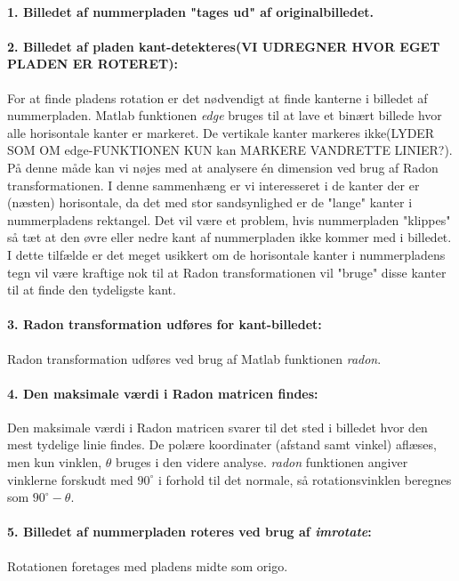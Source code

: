 \paragraph{1. Billedet af nummerpladen "tages ud" af originalbilledet.}
\paragraph{2. Billedet af pladen kant-detekteres(VI UDREGNER HVOR EGET PLADEN ER ROTERET):}
For at finde pladens rotation er det nødvendigt at finde kanterne i billedet af nummerpladen. Matlab funktionen \textit{edge} bruges til at lave et binært billede hvor alle horisontale kanter er markeret. De vertikale kanter markeres ikke(LYDER SOM OM edge-FUNKTIONEN KUN kan MARKERE VANDRETTE LINIER?). På denne måde kan vi nøjes med at analysere én dimension ved brug af Radon transformationen. I denne sammenhæng er vi interesseret i de kanter der er (næsten) horisontale, da det med stor sandsynlighed er de "lange" kanter i nummerpladens rektangel. Det vil være et problem, hvis nummerpladen "klippes" så tæt at den øvre eller nedre kant af nummerpladen ikke kommer med i billedet. I dette tilfælde er det meget usikkert om de horisontale kanter i nummerpladens tegn vil være kraftige nok til at Radon transformationen vil "bruge" disse kanter til at finde den tydeligste kant.

\paragraph{3. Radon transformation udføres for kant-billedet:} Radon transformation udføres ved brug af Matlab funktionen \textit{radon}.

\paragraph{4. Den maksimale værdi i Radon matricen findes:} Den maksimale værdi i Radon matricen svarer til det sted i billedet hvor den mest tydelige linie findes. De polære koordinater (afstand samt vinkel) aflæses, men kun vinklen, $\theta$ bruges i den videre analyse. \textit{radon} funktionen angiver vinklerne forskudt med $90^{\circ}$ i forhold til det normale, så rotationsvinklen beregnes som $90^{\circ} - \theta$.

\paragraph{5. Billedet af nummerpladen roteres ved brug af \textit{imrotate}:} Rotationen foretages med pladens midte som origo.

